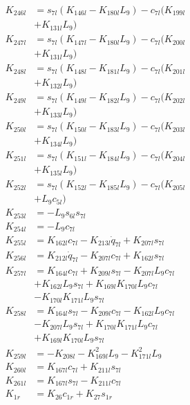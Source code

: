 \begin{multicols}{2}
\begin{align}
K_{246l} &= s_{7l}(K_{146l} - K_{180l}L_9) - c_{7l}(K_{199l}  \nonumber \\
&+ K_{131l}L_9) \nonumber \\
K_{247l} &= s_{7l}(K_{147l} - K_{180l}L_9) - c_{7l}(K_{200l}  \nonumber \\
&+ K_{131l}L_9) \nonumber \\
K_{248l} &= s_{7l}(K_{148l} - K_{181l}L_9) - c_{7l}(K_{201l}  \nonumber \\
&+ K_{132l}L_9) \nonumber \\
K_{249l} &= s_{7l}(K_{149l} - K_{182l}L_9) - c_{7l}(K_{202l}  \nonumber \\
&+ K_{133l}L_9) \nonumber \\
K_{250l} &= s_{7l}(K_{150l} - K_{183l}L_9) - c_{7l}(K_{203l}  \nonumber \\
&+ K_{134l}L_9) \nonumber \\
K_{251l} &= s_{7l}(K_{151l} - K_{184l}L_9) - c_{7l}(K_{204l}  \nonumber \\
&+ K_{135l}L_9) \nonumber \\
K_{252l} &= s_{7l}(K_{152l} - K_{185l}L_9) - c_{7l}(K_{205l}  \nonumber \\
&+ L_9c_{5l}) \nonumber \\
K_{253l} &= -L_9s_{6l}s_{7l} \nonumber \\
K_{254l} &= -L_9c_{7l} \nonumber \\
K_{255l} &= K_{162l}c_{7l} - K_{213l}\dot{q}_{7l} + K_{207l}s_{7l} \nonumber \\
K_{256l} &= K_{212l}\dot{q}_{7l} - K_{207l}c_{7l} + K_{162l}s_{7l} \nonumber \\
K_{257l} &= K_{164l}c_{7l} + K_{209l}s_{7l} - K_{207l}L_9c_{7l}  \nonumber \\
&+ K_{162l}L_9s_{7l} + K_{169l}K_{170l}L_9c_{7l}  \nonumber \\
&- K_{170l}K_{171l}L_9s_{7l} \nonumber \\
K_{258l} &= K_{164l}s_{7l} - K_{209l}c_{7l} - K_{162l}L_9c_{7l}  \nonumber \\
&- K_{207l}L_9s_{7l} + K_{170l}K_{171l}L_9c_{7l}  \nonumber \\
&+ K_{169l}K_{170l}L_9s_{7l} \nonumber \\
K_{259l} &= - K_{208l} - K_{169l}^2L_9 - K_{171l}^2L_9 \nonumber \\
K_{260l} &= K_{167l}c_{7l} + K_{211l}s_{7l} \nonumber \\
K_{261l} &= K_{167l}s_{7l} - K_{211l}c_{7l} \nonumber \\
K_{1r} &= K_{26}c_{1r} + K_{27}s_{1r} \nonumber \\

\end{align}
\end{multicols}
